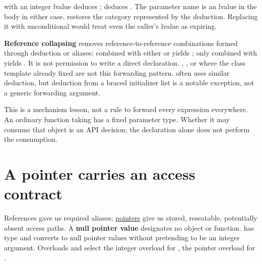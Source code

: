 with an integer lvalue deduces ;  deduces . The parameter name  is an lvalue in the body in either case.  restores the category represented by the deduction. Replacing it with unconditional  would treat even the caller's lvalue as expiring.

\textbf{Reference collapsing} removes reference-to-reference combinations formed through deduction or aliases: \BookInlineCode{{\&}}{\&} combined with either \BookInlineCode{{\&}}{\&} or \BookInlineCode{{\&}{\&}}{\&\&} yields \BookInlineCode{{\&}}{\&}; only \BookInlineCode{{\&}{\&}}{\&\&} combined with \BookInlineCode{{\&}{\&}}{\&\&} yields \BookInlineCode{{\&}{\&}}{\&\&}. It is not permission to write a direct  declaration. , , or  where the class template already fixed  are not this forwarding pattern.  often uses similar deduction, but deduction from a braced initializer list is a notable exception, not a generic forwarding argument.

This is a mechanism lesson, not a rule to forward every expression everywhere. An ordinary function taking  has a fixed parameter type. Whether it may consume that object is an API decision; the declaration alone does not perform the consumption.

\section{A pointer carries an access contract}\label{01-foundations-i-ch003-a-pointer-carries-an-access-contract}

\hypertarget{01-foundations-i-ch003-a-pointer-carries-an-access-contract}{}

References gave us required aliases; \hyperref[appendix-afae48c31800]{pointers} give us stored, reseatable, potentially absent access paths. A \textbf{null pointer value} designates no object or function.  has type  and converts to null pointer values without pretending to be an integer argument. Overloads  and  select the integer overload for , the pointer overload for .


